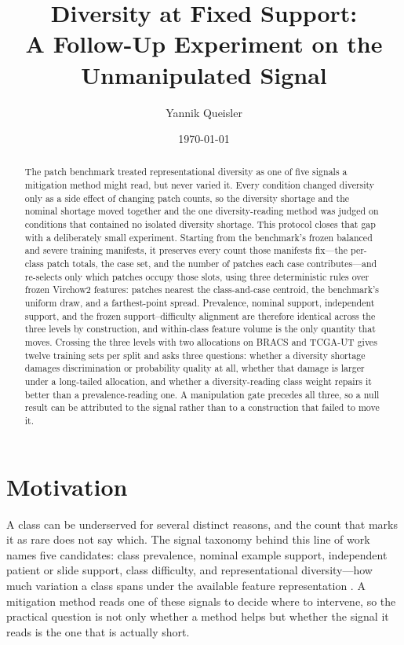 \documentclass[11pt]{article}
\title{Diversity at Fixed Support:\\
A Follow-Up Experiment on the Unmanipulated Signal}
\author{Yannik Queisler}
\date{\today}
\begin{document}
\maketitle

\begin{abstract}
\noindent The patch benchmark treated representational diversity as one of five signals a mitigation method might read, but never varied it. Every condition changed diversity only as a side effect of changing patch counts, so the diversity shortage and the nominal shortage moved together and the one diversity-reading method was judged on conditions that contained no isolated diversity shortage. This protocol closes that gap with a deliberately small experiment. Starting from the benchmark's frozen balanced and severe training manifests, it preserves every count those manifests fix---the per-class patch totals, the case set, and the number of patches each case contributes---and re-selects only which patches occupy those slots, using three deterministic rules over frozen Virchow2 features: patches nearest the class-and-case centroid, the benchmark's uniform draw, and a farthest-point spread. Prevalence, nominal support, independent support, and the frozen support--difficulty alignment are therefore identical across the three levels by construction, and within-class feature volume is the only quantity that moves. Crossing the three levels with two allocations on BRACS and TCGA-UT gives twelve training sets per split and asks three questions: whether a diversity shortage damages discrimination or probability quality at all, whether that damage is larger under a long-tailed allocation, and whether a diversity-reading class weight repairs it better than a prevalence-reading one. A manipulation gate precedes all three, so a null result can be attributed to the signal rather than to a construction that failed to move it.
\end{abstract}

\setcounter{tocdepth}{2}
\tableofcontents
\clearpage

\section{Motivation}
\label{sec:motivation}
A class can be underserved for several distinct reasons, and the count that marks it as rare does not say which. The signal taxonomy behind this line of work names five candidates: class prevalence, nominal example support, independent patient or slide support, class difficulty, and representational diversity---how much variation a class spans under the available feature representation \citep{queisler2026imbalanceMethods}. A mitigation method reads one of these signals to decide where to intervene, so the practical question is not only whether a method helps but whether the signal it reads is the one that is actually short.
\end{document}
